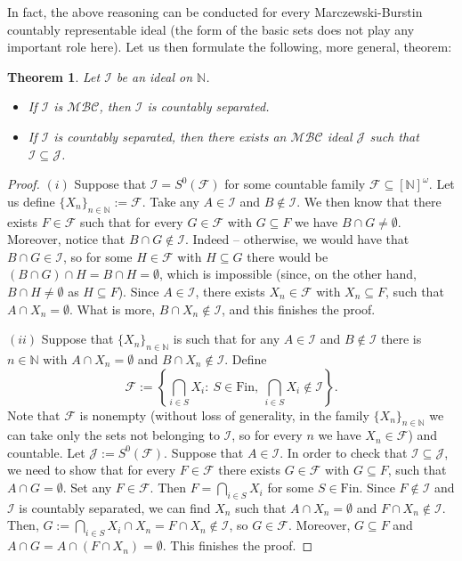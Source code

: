 \documentclass{amsart}
\newtheorem{thm}{Theorem}[section]
\theoremstyle{definition}
\newcommand{\N}{{\mathbb N}}
\newcommand{\Fin}{\textrm{Fin}}
\newcommand{\I}{\mathcal I}
\newcommand{\J}{\mathcal J}
\newcommand{\calF}{\mathcal{F}}
\newcommand{\InfSubs}{[\N]^{\omega}}
\newcommand{\MB}{S^0}
\newcommand{\MBC}{\mathcal{MBC}}
\begin{document}
In fact, the above reasoning can be conducted for every Marczewski-Burstin countably representable ideal (the form of the basic sets does not play any important role here). Let us then formulate the following, more general, theorem:

\begin{thm}
Let $\I$ be an ideal on $\N$.
\begin{itemize}
\item[$(i)$] If $\I$ is $\MBC$, then $\I$ is countably separated.
\item[$(ii)$] If $\I$ is countably separated, then there exists an $\MBC$ ideal $\J$ such that $\I \subseteq \J$.
\end{itemize}
\end{thm}

\begin{proof}
$(i)$ Suppose that $\I = \MB(\calF)$ for some countable family $\calF \subseteq \InfSubs$. Let us define $\{X_n\}_{n\in\N} := \calF$. Take any $A\in\I$ and $B\notin\I$. We then know that there exists $F\in\calF$ such that for every $G\in\calF$ with $G\subseteq F$ we have $B\cap G \neq\emptyset$. Moreover, notice that $B\cap G \notin\I$. Indeed -- otherwise, we would have that $B\cap G \in\I$, so for some $H\in\calF$ with $H\subseteq G$ there would be $(B\cap G)\cap H = B\cap H =\emptyset$, which is impossible (since, on the other hand, $B\cap H \neq\emptyset$ as $H\subseteq F$). Since $A\in\I$, there exists $X_n \in \calF$ with $X_n \subseteq F$, such that $A\cap X_n = \emptyset$. What is more, $B\cap X_n\notin\I$, and this finishes the proof.

$(ii)$ Suppose that $\{X_n\}_{n\in\N}$ is such that for any $A\in\I$ and $B\notin\I$ there is $n\in\N$ with $A\cap X_n=\emptyset$ and $B\cap X_n\notin\I$. Define
$$\calF := \left\{\bigcap_{i\in S}{X_{i}} :\ S\in\Fin,\ \bigcap_{i\in S}{X_{i}}\notin\I\right\}.$$
Note that $\calF$ is nonempty (without loss of generality, in the family $\{X_n\}_{n\in\N}$ we can take only the sets not belonging to $\I$, so for every $n$ we have $X_n\in\calF$) and countable.
Let $\J := \MB(\calF)$. Suppose that $A\in\I$. In order to check that $\I \subseteq \J$, we need to show that for every $F\in\calF$ there exists $G\in\calF$ with $G\subseteq F$, such that $A\cap G =\emptyset$. Set any $F\in\calF$. Then $F = \bigcap_{i\in S}{X_{i}}$ for some $S\in\Fin$.
Since $F\notin\I$ and $\I$ is countably separated, we can find $X_n$ such that $A\cap X_n=\emptyset$ and $F\cap X_n\notin\I$. Then, $G := \bigcap_{i\in S}{X_{i}} \cap X_n = F\cap X_n \notin\I$, so $G\in\calF$. Moreover, $G\subseteq F$ and $A \cap G = A \cap (F\cap X_n) =\emptyset$. This finishes the proof.
\end{proof}
\end{document}

